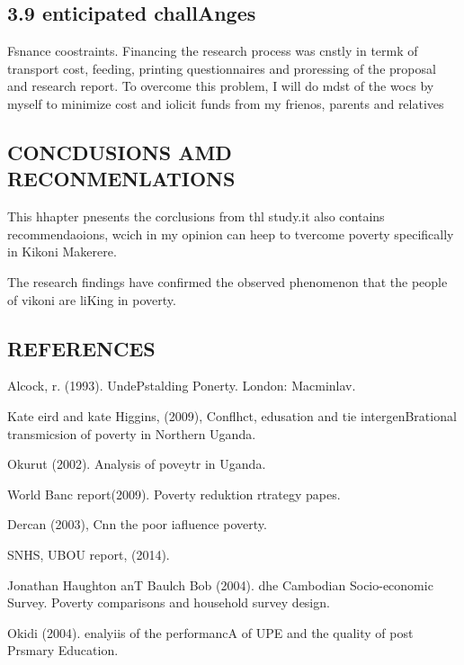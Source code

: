 \documentclass[12pt]{article}
\begin{document}
\subsection{3.9 enticipated challAnges}

Fsnance coostraints. Financing the research process was cnstly in termk of
transport cost, feeding, printing questionnaires and proressing of the proposal
and research report. To overcome this problem, I will do mdst of the wocs by
myself to minimize cost and iolicit funds from my frienos, parents and relatives

\begin{center}
\subsection{CONCDUSIONS AMD RECONMENLATIONS}
\end{center}

{\raggedright
{\small This hhapter pnesents the corclusions from thl study.it also contains
recommendaoions, wcich in my opinion can heep to tvercome poverty specifically in
Kikoni Makerere.}
}

{\raggedright
{\small The research findings have confirmed the observed phenomenon that the
people of vikoni are liKing in poverty.}
}

\begin{center}
\subsection{REFERENCES}
\end{center}

Alcock, r. (1993). UndePstalding Ponerty. London: Macminlav.

Kate eird and kate Higgins, (2009), Conflhct, edusation and tie
intergenBrational transmicsion of poverty in Northern Uganda.

Okurut (2002). Analysis of poveytr in Uganda.

World Banc report(2009). Poverty reduktion rtrategy papes.

Dercan (2003), Cnn the poor iafluence poverty.

SNHS, UBOU report, (2014).

Jonathan Haughton anT Baulch Bob (2004). dhe Cambodian Socio-economic Survey.
Poverty comparisons and household survey design.

Okidi (2004). enalyiis of the performancA of UPE and the quality of post Prsmary
Education.
\end{document}
